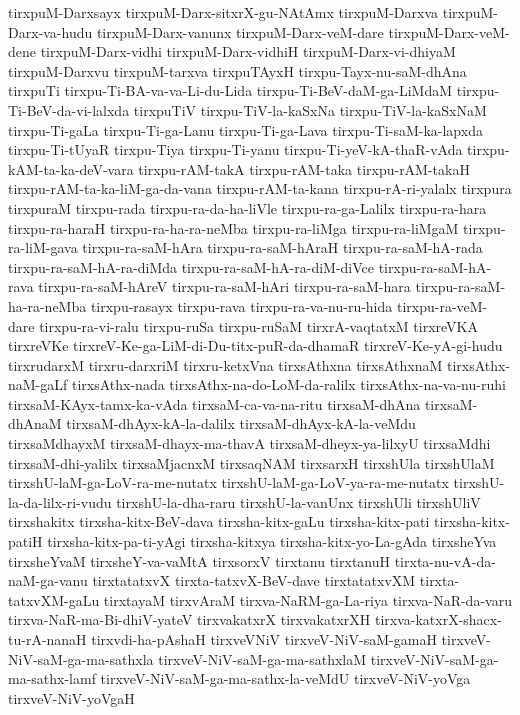 {tirxpuM-Darxsayx
tirxpuM-Darx-sitxrX-gu-NAtAmx
tirxpuM-Darxva
tirxpuM-Darx-va-hudu
tirxpuM-Darx-vanunx
tirxpuM-Darx-veM-dare
tirxpuM-Darx-veM-dene
tirxpuM-Darx-vidhi
tirxpuM-Darx-vidhiH
tirxpuM-Darx-vi-dhiyaM
tirxpuM-Darxvu
tirxpuM-tarxva
tirxpuTAyxH
tirxpu-Tayx-nu-saM-dhAna
tirxpuTi
tirxpu-Ti-BA-va-va-Li-du-Lida
tirxpu-Ti-BeV-daM-ga-LiMdaM
tirxpu-Ti-BeV-da-vi-lalxda
tirxpuTiV
tirxpu-TiV-la-kaSxNa
tirxpu-TiV-la-kaSxNaM
tirxpu-Ti-gaLa
tirxpu-Ti-ga-Lanu
tirxpu-Ti-ga-Lava
tirxpu-Ti-saM-ka-lapxda
tirxpu-Ti-tUyaR
tirxpu-Tiya
tirxpu-Ti-yanu
tirxpu-Ti-yeV-kA-thaR-vAda
tirxpu-kAM-ta-ka-deV-vara
tirxpu-rAM-takA
tirxpu-rAM-taka
tirxpu-rAM-takaH
tirxpu-rAM-ta-ka-liM-ga-da-vana
tirxpu-rAM-ta-kana
tirxpu-rA-ri-yalalx
tirxpura
tirxpuraM
tirxpu-rada
tirxpu-ra-da-ha-liVle
tirxpu-ra-ga-Lalilx
tirxpu-ra-hara
tirxpu-ra-haraH
tirxpu-ra-ha-ra-neMba
tirxpu-ra-liMga
tirxpu-ra-liMgaM
tirxpu-ra-liM-gava
tirxpu-ra-saM-hAra
tirxpu-ra-saM-hAraH
tirxpu-ra-saM-hA-rada
tirxpu-ra-saM-hA-ra-diMda
tirxpu-ra-saM-hA-ra-diM-diVce
tirxpu-ra-saM-hA-rava
tirxpu-ra-saM-hAreV
tirxpu-ra-saM-hAri
tirxpu-ra-saM-hara
tirxpu-ra-saM-ha-ra-neMba
tirxpu-rasayx
tirxpu-rava
tirxpu-ra-va-nu-ru-hida
tirxpu-ra-veM-dare
tirxpu-ra-vi-ralu
tirxpu-ruSa
tirxpu-ruSaM
tirxrA-vaqtatxM
tirxreVKA
tirxreVKe
tirxreV-Ke-ga-LiM-di-Du-titx-puR-da-dhamaR
tirxreV-Ke-yA-gi-hudu
tirxrudarxM
tirxru-darxriM
tirxru-ketxVna
tirxsAthxna
tirxsAthxnaM
tirxsAthx-naM-gaLf
tirxsAthx-nada
tirxsAthx-na-do-LoM-da-ralilx
tirxsAthx-na-va-nu-ruhi
tirxsaM-KAyx-tamx-ka-vAda
tirxsaM-ca-va-na-ritu
tirxsaM-dhAna
tirxsaM-dhAnaM
tirxsaM-dhAyx-kA-la-dalilx
tirxsaM-dhAyx-kA-la-veMdu
tirxsaMdhayxM
tirxsaM-dhayx-ma-thavA
tirxsaM-dheyx-ya-lilxyU
tirxsaMdhi
tirxsaM-dhi-yalilx
tirxsaMjacnxM
tirxsaqNAM
tirxsarxH
tirxshUla
tirxshUlaM
tirxshU-laM-ga-LoV-ra-me-nutatx
tirxshU-laM-ga-LoV-ya-ra-me-nutatx
tirxshU-la-da-lilx-ri-vudu
tirxshU-la-dha-raru
tirxshU-la-vanUnx
tirxshUli
tirxshUliV
tirxshakitx
tirxsha-kitx-BeV-dava
tirxsha-kitx-gaLu
tirxsha-kitx-pati
tirxsha-kitx-patiH
tirxsha-kitx-pa-ti-yAgi
tirxsha-kitxya
tirxsha-kitx-yo-La-gAda
tirxsheYva
tirxsheYvaM
tirxsheY-va-vaMtA
tirxsorxV
tirxtanu
tirxtanuH
tirxta-nu-vA-da-naM-ga-vanu
tirxtatatxvX
tirxta-tatxvX-BeV-dave
tirxtatatxvXM
tirxta-tatxvXM-gaLu
tirxtayaM
tirxvAraM
tirxva-NaRM-ga-La-riya
tirxva-NaR-da-varu
tirxva-NaR-ma-Bi-dhiV-yateV
tirxvakatxrX
tirxvakatxrXH
tirxva-katxrX-shacx-tu-rA-nanaH
tirxvdi-ha-pAshaH
tirxveVNiV
tirxveV-NiV-saM-gamaH
tirxveV-NiV-saM-ga-ma-sathxla
tirxveV-NiV-saM-ga-ma-sathxlaM
tirxveV-NiV-saM-ga-ma-sathx-lamf
tirxveV-NiV-saM-ga-ma-sathx-la-veMdU
tirxveV-NiV-yoVga
tirxveV-NiV-yoVgaH
}
